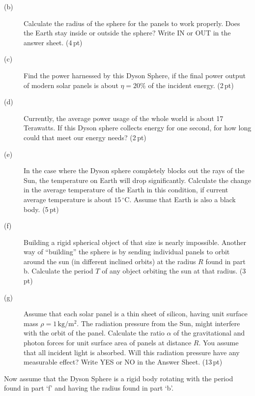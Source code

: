 \begin{description}
\item[(b)] Calculate the radius of the sphere for the panels to work properly.
  Does the Earth stay inside or outside the sphere? Write IN or OUT in the
  answer sheet. \hfill(4\,pt)
\item[(c)] Find the power harnessed by this Dyson Sphere, if the final power
  output of modern solar panels is about $\eta = 20\%$ of the incident energy.
  \hfill(2\,pt)
\item[(d)] Currently, the average power usage of the whole world is about 17
  Terawatts. If this Dyson sphere collects energy for one second, for how long
  could that meet our energy needs? \hfill(2\,pt)
\item[(e)] In the case where the Dyson sphere completely blocks out the rays
  of the Sun, the temperature on Earth will drop significantly. Calculate the
  change in the average temperature of the Earth in this condition, if current
  average temperature is about $15\,^\circ$C. Assume that Earth is also a
  black body. \hfill(5\,pt)
\item[(f)] Building a rigid spherical object of that size is nearly
  impossible. Another way of ``building'' the sphere is by sending individual
  panels to orbit around the sun (in different inclined orbits) at the radius
  $R$ found in part b. Calculate the period $T$ of any object orbiting the sun
  at that radius. \hfill(3\,pt)
\item[(g)] Assume that each solar panel is a thin sheet of silicon, having
  unit surface mass $\rho = 1\,\mathrm{kg/m^2}$. The radiation pressure from
  the Sun, might interfere with the orbit of the panel. Calculate the ratio
  $\alpha$ of the gravitational and photon forces for unit surface area of
  panels at distance $R$. You assume that all incident light is absorbed. Will
  this radiation pressure have any measurable effect? Write YES or NO in the
  Answer Sheet. \hfill(13\,pt)
\end{description}

Now assume that the Dyson Sphere is a rigid body rotating with the period
found in part `f' and having the radius found in part `b'.

